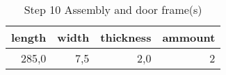 \begin{table}[h!]
\centering
\caption{Step 10 Assembly and door frame(s)}
\begin{tabular}{rrrr}
\toprule
 length &  width &  thickness &  ammount \\
\midrule
  285,0 &    7,5 &        2,0 &        2 \\
\bottomrule
\end{tabular}
\end{table}
